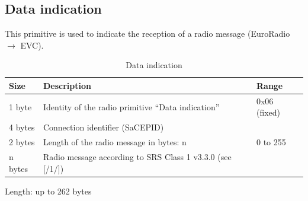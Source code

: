 \documentclass[nocc]{template/openetcs_report}
\begin{document}
\subsection{Data indication}
This primitive is used to indicate the reception of a radio message (EuroRadio $\rightarrow$ EVC).
 			\begin{longtable}{|l|l|l|}
				\caption{Data indication}\\ 
				\hline
				
					\begin{minipage}[t]{0.1\linewidth} \textbf{Size}	\end{minipage}
				&	\begin{minipage}[t]{0.5\linewidth} \textbf{Description}	\end{minipage}
				&	\begin{minipage}[t]{0.3\linewidth} \textbf{Range} \end{minipage} \\
				
				\hline
					 \begin{minipage}[t]{0.1\linewidth}1 byte \end{minipage}
					&\begin{minipage}[t]{0.6\linewidth}Identity of the radio primitive "`Data indication"'	\end{minipage}
					&\begin{minipage}[t]{0.3\linewidth}0x06 (fixed) \end{minipage} \\
					
				\hline
					 \begin{minipage}[t]{0.1\linewidth}4 bytes \end{minipage}
					&\begin{minipage}[t]{0.6\linewidth}Connection identifier (SaCEPID)	\end{minipage}
					&\begin{minipage}[t]{0.3\linewidth} \end{minipage} \\
					
				\hline
					 \begin{minipage}[t]{0.1\linewidth}2 bytes \end{minipage}
					&\begin{minipage}[t]{0.6\linewidth}Length of the radio message in bytes: n	\end{minipage}
					&\begin{minipage}[t]{0.3\linewidth}0 to 255 \end{minipage} \\
					
				\hline
					 \begin{minipage}[t]{0.1\linewidth}n bytes \end{minipage}
					&\begin{minipage}[t]{0.6\linewidth}Radio message according to SRS Class 1 v3.3.0 (see [/1/])	\end{minipage}
					&\begin{minipage}[t]{0.3\linewidth}\end{minipage} \\
					
				\hline	
			\end{longtable}
			Length: up to 262 bytes
\end{document}
